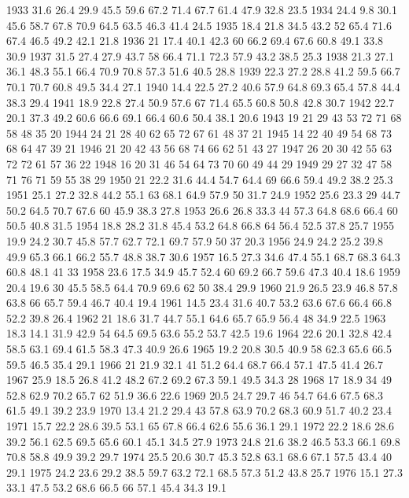 1933	31.6	26.4	29.9	45.5	59.6	67.2	71.4	67.7	61.4	47.9	32.8	23.5
1934	24.4	9.8	30.1	45.6	58.7	67.8	70.9	64.5	63.5	46.3	41.4	24.5
1935	18.4	21.8	34.5	43.2	52	65.4	71.6	67.4	46.5	49.2	42.1	21.8
1936	21	17.4	40.1	42.3	60	66.2	69.4	67.6	60.8	49.1	33.8	30.9
1937	31.5	27.4	27.9	43.7	58	66.4	71.1	72.3	57.9	43.2	38.5	25.3
1938	21.3	27.1	36.1	48.3	55.1	66.4	70.9	70.8	57.3	51.6	40.5	28.8
1939	22.3	27.2	28.8	41.2	59.5	66.7	70.1	70.7	60.8	49.5	34.4	27.1
1940	14.4	22.5	27.2	40.6	57.9	64.8	69.3	65.4	57.8	44.4	38.3	29.4
1941	18.9	22.8	27.4	50.9	57.6	67	71.4	65.5	60.8	50.8	42.8	30.7
1942	22.7	20.1	37.3	49.2	60.6	66.6	69.1	66.4	60.6	50.4	38.1	20.6
1943	19	21	29	43	53	72	71	68	58	48	35	20
1944	24	21	28	40	62	65	72	67	61	48	37	21
1945	14	22	40	49	54	68	73	68	64	47	39	21
1946	21	20	42	43	56	68	74	66	62	51	43	27
1947	26	20	30	42	55	63	72	72	61	57	36	22
1948	16	20	31	46	54	64	73	70	60	49	44	29
1949	29	27	32	47	58	71	76	71	59	55	38	29
1950	21	22.2	31.6	44.4	54.7	64.4	69	66.6	59.4	49.2	38.2	25.3
1951	25.1	27.2	32.8	44.2	55.1	63	68.1	64.9	57.9	50	31.7	24.9
1952	25.6	23.3	29	44.7	50.2	64.5	70.7	67.6	60	45.9	38.3	27.8
1953	26.6	26.8	33.3	44	57.3	64.8	68.6	66.4	60	50.5	40.8	31.5
1954	18.8	28.2	31.8	45.4	53.2	64.8	66.8	64	56.4	52.5	37.8	25.7
1955	19.9	24.2	30.7	45.8	57.7	62.7	72.1	69.7	57.9	50	37	20.3
1956	24.9	24.2	25.2	39.8	49.9	65.3	66.1	66.2	55.7	48.8	38.7	30.6
1957	16.5	27.3	34.6	47.4	55.1	68.7	68.3	64.3	60.8	48.1	41	33
1958	23.6	17.5	34.9	45.7	52.4	60	69.2	66.7	59.6	47.3	40.4	18.6
1959	20.4	19.6	30	45.5	58.5	64.4	70.9	69.6	62	50	38.4	29.9
1960	21.9	26.5	23.9	46.8	57.8	63.8	66	65.7	59.4	46.7	40.4	19.4
1961	14.5	23.4	31.6	40.7	53.2	63.6	67.6	66.4	66.8	52.2	39.8	26.4
1962	21	18.6	31.7	44.7	55.1	64.6	65.7	65.9	56.4	48	34.9	22.5
1963	18.3	14.1	31.9	42.9	54	64.5	69.5	63.6	55.2	53.7	42.5	19.6
1964	22.6	20.1	32.8	42.4	58.5	63.1	69.4	61.5	58.3	47.3	40.9	26.6
1965	19.2	20.8	30.5	40.9	58	62.3	65.6	66.5	59.5	46.5	35.4	29.1
1966	21	21.9	32.1	41	51.2	64.4	68.7	66.4	57.1	47.5	41.4	26.7
1967	25.9	18.5	26.8	41.2	48.2	67.2	69.2	67.3	59.1	49.5	34.3	28
1968	17	18.9	34	49	52.8	62.9	70.2	65.7	62	51.9	36.6	22.6
1969	20.5	24.7	29.7	46	54.7	64.6	67.5	68.3	61.5	49.1	39.2	23.9
1970	13.4	21.2	29.4	43	57.8	63.9	70.2	68.3	60.9	51.7	40.2	23.4
1971	15.7	22.2	28.6	39.5	53.1	65	67.8	66.4	62.6	55.6	36.1	29.1
1972	22.2	18.6	28.6	39.2	56.1	62.5	69.5	65.6	60.1	45.1	34.5	27.9
1973	24.8	21.6	38.2	46.5	53.3	66.1	69.8	70.8	58.8	49.9	39.2	29.7
1974	25.5	20.6	30.7	45.3	52.8	63.1	68.6	67.1	57.5	43.4	40	29.1
1975	24.2	23.6	29.2	38.5	59.7	63.2	72.1	68.5	57.3	51.2	43.8	25.7
1976	15.1	27.3	33.1	47.5	53.2	68.6	66.5	66	57.1	45.4	34.3	19.1
